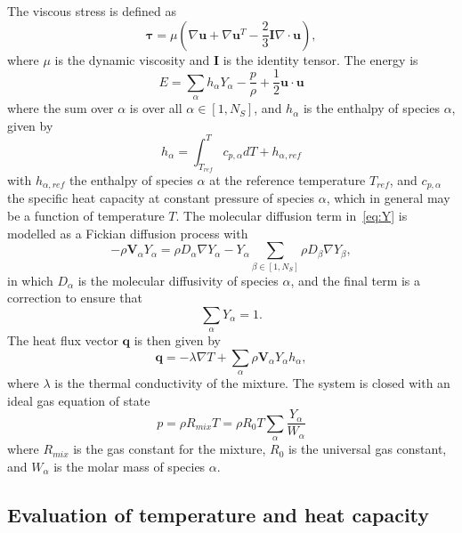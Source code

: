 \documentclass[notitlepage]{revtex4-1}
\begin{document}
The viscous stress is defined as 
\begin{equation}\bm{\tau}=\mu\left(\nabla\bm{u}+\nabla\bm{u}^{T}-\frac{2}{3}\bm{I}\nabla\cdot\bm{u}\right)\label{eq:tau},\end{equation}
where $\mu$ is the dynamic viscosity and $\bm{I}$ is the identity tensor. The energy is
\begin{equation}E=\displaystyle\sum_{\alpha}h_{\alpha}Y_{\alpha}-\frac{p}{\rho}+\frac{1}{2}\bm{u}\cdot\bm{u}\label{eq:E}\end{equation}
where the sum over $\alpha$ is over all $\alpha\in\left[1,N_{S}\right]$, and $h_{\alpha}$ is the enthalpy of species $\alpha$, given by
\begin{equation}h_{\alpha}=\displaystyle\int_{T_{ref}}^{T}c_{p,\alpha}dT + h_{\alpha,ref}\label{eq:h}\end{equation}
with $h_{\alpha,ref}$ the enthalpy of species $\alpha$ at the reference temperature $T_{ref}$, and $c_{p,\alpha}$ the specific heat capacity at constant pressure of species $\alpha$, which in general may be a function of temperature $T$.
The molecular diffusion term in~\eqref{eq:Y} is modelled as a Fickian diffusion process with
\begin{equation}-\rho\bm{V}_{\alpha}Y_{\alpha}=\rho{D}_{\alpha}\nabla{Y}_{\alpha}-Y_{\alpha}\displaystyle\sum_{\beta\in\left[1,N_{S}\right]}\rho{D}_{\beta}\nabla{Y}_{\beta}\label{eq:fickdiff},\end{equation}
in which $D_{\alpha}$ is the molecular diffusivity of species $\alpha$, and the final term is a correction to ensure that 
\begin{equation}\displaystyle\sum_{\alpha}Y_{\alpha}=1.\end{equation}
The heat flux vector $\bm{q}$ is then given by
\begin{equation}\bm{q}=-\lambda\nabla{T}+\displaystyle\sum_{\alpha}\rho\bm{V}_{\alpha}Y_{\alpha}h_{\alpha}\label{eq:hfv},\end{equation}
where $\lambda$ is the thermal conductivity of the mixture.
The system is closed with an ideal gas equation of state
\begin{equation}p=\rho{R}_{mix}T=\rho{R}_{0}T\displaystyle\sum_{\alpha}\frac{Y_{\alpha}}{W_{\alpha}}\label{eq:eos}\end{equation}
where $R_{mix}$ is the gas constant for the mixture, $R_{0}$ is the universal gas constant, and $W_{\alpha}$ is the molar mass of species $\alpha$.

\subsection{Evaluation of temperature and heat capacity}
\end{document}
